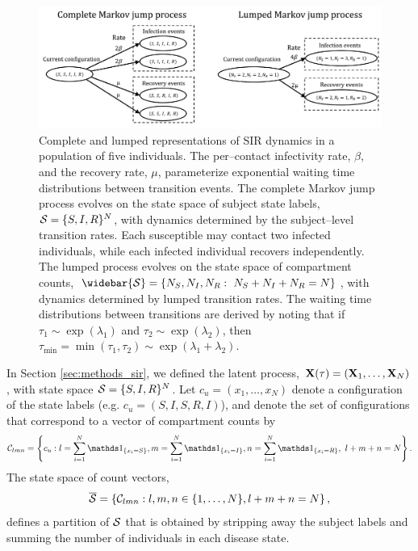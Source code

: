 \begin{figure}
	\centering
	\includegraphics[width=0.9\linewidth]{figures/SIR_representations}
	\caption{Complete and lumped representations of SIR dynamics in a population of five individuals. The per--contact infectivity rate, $ \beta $, and the recovery rate, $ \mu $, parameterize exponential waiting time distributions between transition events. The complete Markov jump process evolves on the state space of subject state labels, $ \mathcal{S} = \lbrace S,I,R\rbrace^N $, with dynamics determined by the subject--level transition rates. Each susceptible may contact two infected individuals, while each infected individual recovers independently. The lumped process evolves on the state space of compartment counts, $ \widebar{\mcS} = \lbrace N_S,N_I,N_R:\ N_S + N_I+N_R=N\rbrace $, with dynamics determined by lumped transition rates. The waiting time distributions between transitions are derived by noting that if $ \tau_1\sim \exp(\lambda_1) $ and $ \tau_2\sim\exp(\lambda_2) $, then $ \tau_{\min} = \min(\tau_1,\tau_2)\sim\exp(\lambda_1+\lambda_2) $.}
	\label{fig:sirrepresentations}
\end{figure}

In Section \ref{sec:methods_sir}, we defined the latent process, $ \mathbf{X}(\tau) = (\mathbf{X}_1,\dots,\mathbf{X}_N)$, with state space $ \mathcal{S} = \lbrace S, I, R\rbrace^N $. Let $ c_u = (x_1,\dots,x_N) $ denote a configuration of the state labels (e.g. $ c_u = (S, I, S, R, I) $), and denote the set of configurations that correspond to a vector of compartment counts by $$ \mcC_{lmn} = \left \lbrace c_u:l=\sum_{i=1}^N\ind{x_i = S},m=\sum_{i=1}^N\ind{x_i=I},n = \sum_{i=1}^N\ind{x_i=R},\ l+m+n=N \right \rbrace. $$ 
The state space of count vectors, 
$$ \overline{\mathcal{S}} = \left \lbrace \mathcal{C}_{lmn}: l,m,n \in \lbrace1,\dots,N\rbrace, l+m+n = N \right \rbrace, $$ 
defines a partition of $ \mathcal{S} $ that is obtained by stripping away the subject labels and summing the number of individuals in each disease state. 

